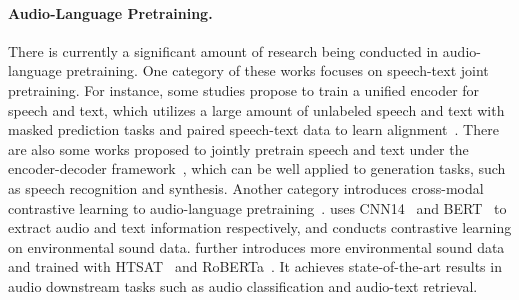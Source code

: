 \paragraph{Audio-Language Pretraining.}

There is currently a significant amount of research being conducted in audio-language pretraining.
One category of these works focuses on speech-text joint pretraining. For instance, some studies propose to train a unified encoder for speech and text, which utilizes a large amount of unlabeled speech and text with masked prediction tasks and paired speech-text data to learn alignment~\cite{slam,mslam,maestro,speechlm}. 
There are also some works proposed to jointly pretrain speech and text under the encoder-decoder framework~\cite{speecht5,stpt,speechut,mmspeech}, which can be well applied to generation tasks, such as speech recognition and synthesis. 
Another category introduces cross-modal contrastive learning to audio-language pretraining~\cite{audioclip,clap,wav2clip,laion_clap}. \cite{clap} uses CNN14~\cite{panns} and BERT~\cite{bert} to extract audio and text information respectively, and conducts contrastive learning on environmental sound data. 
\cite{laion_clap} further introduces more environmental sound data and trained with HTSAT~\cite{htsat} and RoBERTa~\cite{roberta}. 
It achieves state-of-the-art results in audio downstream tasks such as audio classification and audio-text retrieval.



